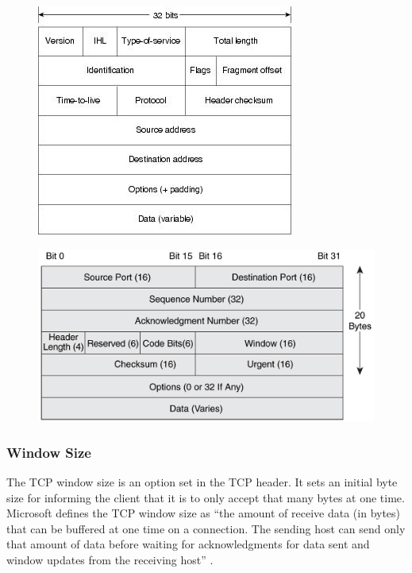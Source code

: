 \begin{figure}
\centering
\begin{minipage}{.5\textwidth}
  \centering
  \includegraphics[width=.8\linewidth]{images/tcpdiagram.jpg}
  \label{fig:ipDiagram}
\end{minipage}%
\begin{minipage}{.5\textwidth}
  \centering
  \includegraphics[width=1\linewidth]{images/tcpheader.jpg}
  \label{fig:tcpDiagram}
\end{minipage}
\end{figure}

\subsubsection{Window Size}

The TCP window size is an option set in the TCP header.  It sets an initial byte size for informing the client that it is to only accept that many bytes at one time.  Microsoft defines the TCP window size as ``the amount of receive data (in bytes) that can be buffered at one time on a connection. The sending host can send only that amount of data before waiting for acknowledgments for data sent and window updates from the receiving host'' \cite{Microsoft1}. 


